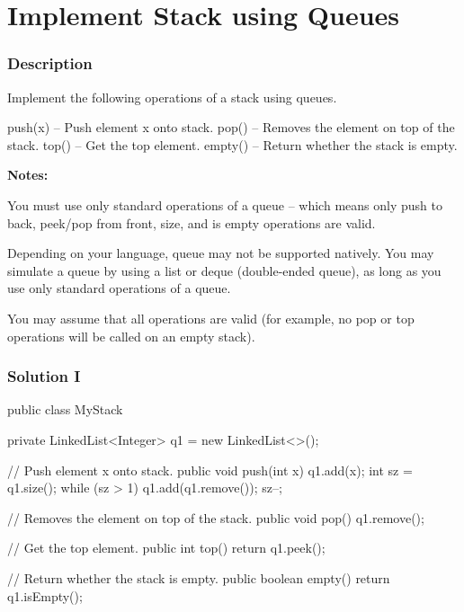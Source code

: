 \newpage

\section{Implement Stack using Queues} %

\subsubsection{Description}
Implement the following operations of a stack using queues.
\begin{Code}
push(x) -- Push element x onto stack.
pop() -- Removes the element on top of the stack.
top() -- Get the top element.
empty() -- Return whether the stack is empty.
\end{Code}

\textbf{Notes:}

You must use only standard operations of a queue -- which means only push to back, peek/pop from front, size, and is empty operations are valid.

Depending on your language, queue may not be supported natively. You may simulate a queue by using a list or deque (double-ended queue), as long as you use only standard operations of a queue.

You may assume that all operations are valid (for example, no pop or top operations will be called on an empty stack).

\subsubsection{Solution I}

\begin{Code}
public class MyStack {
    private LinkedList<Integer> q1 = new LinkedList<>();

    // Push element x onto stack.
    public void push(int x) {
        q1.add(x);
        int sz = q1.size();
        while (sz > 1) {
            q1.add(q1.remove());
            sz--;
        }
    }

    // Removes the element on top of the stack.
    public void pop() {
        q1.remove();
    }


    // Get the top element.
    public int top() {
        return q1.peek();
    }

    // Return whether the stack is empty.
    public boolean empty() {
        return q1.isEmpty();
    }
}
\end{Code}

